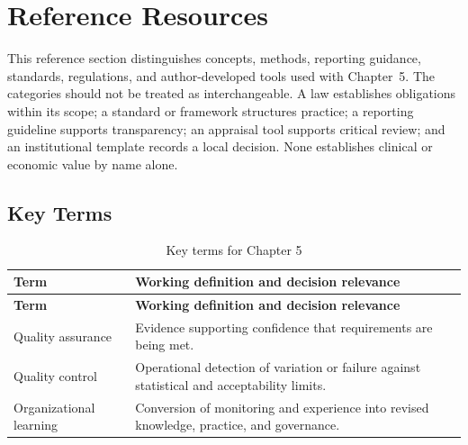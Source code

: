 \section{Reference Resources}
\label{sec:comp-ch05-reference}

This reference section distinguishes concepts, methods, reporting guidance,
standards, regulations, and author-developed tools used with Chapter~5. The
categories should not be treated as interchangeable. A law establishes obligations
within its scope; a standard or framework structures practice; a reporting guideline
supports transparency; an appraisal tool supports critical review; and an
institutional template records a local decision. None establishes clinical or
economic value by name alone. 

\subsection{Key Terms}
\begin{longtable}{@{}p{}p{}@{}}
\caption{Key terms for Chapter 5}
\label{tab:comp-ch05-key-terms}\\
\toprule
\textbf{Term} & \textbf{Working definition and decision relevance} \\
\midrule
\endfirsthead
\toprule
\textbf{Term} & \textbf{Working definition and decision relevance} \\
\midrule
\endhead
\bottomrule
\endlastfoot
Quality assurance & Evidence supporting confidence that requirements are being met. \\
Quality control & Operational detection of variation or failure against statistical and acceptability limits. \\
Organizational learning & Conversion of monitoring and experience into revised knowledge, practice, and governance. \\
\end{longtable}

